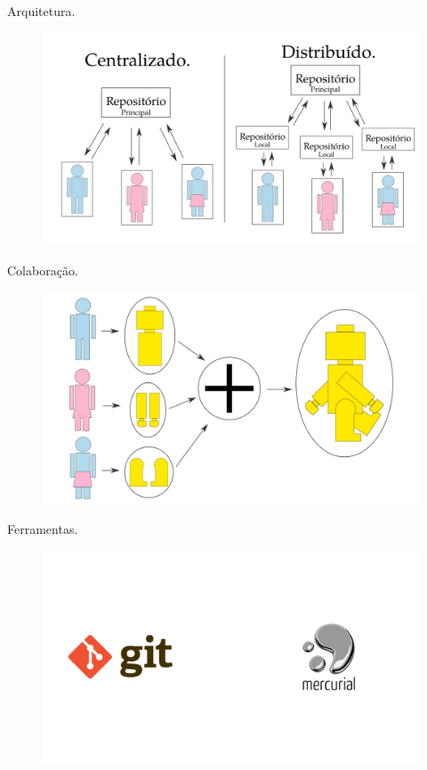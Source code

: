\documentclass[brazil,aspectratio=169]{beamer}
\begin{document}
\begin{frame}{Arquitetura.}
\begin{figure}
\includegraphics[scale=0.35]{imagens/arquitetura}
\end{figure}
\end{frame}

\begin{frame}{Colaboração.}
\begin{figure}
\includegraphics[scale=0.35]{imagens/colaboracao}
\end{figure}
\end{frame}

\begin{frame}{Ferramentas.}
\begin{figure}
\includegraphics[scale=0.35]{imagens/ferramentas}
\end{figure}
\end{frame}
\end{document}
